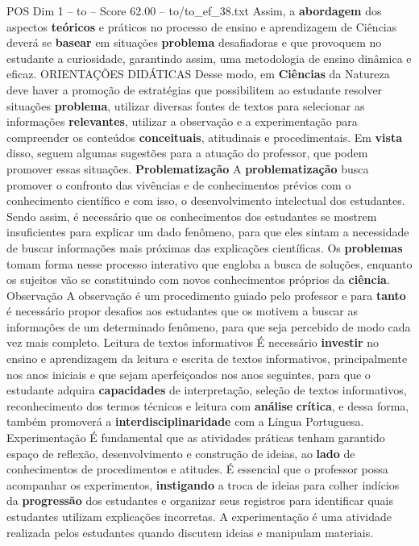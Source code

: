 \begin{textsample}{POS Dim 1 – to – Score 62.00 – to/to\_ef\_38.txt}
Assim, a \textbf{abordagem} dos aspectos \textbf{teóricos} e práticos no processo de ensino e aprendizagem de Ciências deverá se \textbf{basear} em situações \textbf{problema} desafiadoras e que provoquem no estudante a curiosidade, garantindo assim, uma metodologia de ensino dinâmica e eficaz.
ORIENTAÇÕES DIDÁTICAS Desse modo, em \textbf{Ciências} da Natureza deve haver a promoção de estratégias que possibilitem ao estudante resolver situações \textbf{problema}, utilizar diversas fontes de textos para selecionar as informações \textbf{relevantes}, utilizar a observação e a experimentação para compreender os conteúdos \textbf{conceituais}, atitudinais e procedimentais.
Em \textbf{vista} disso, seguem algumas sugestões para a atuação do professor, que podem promover essas situações. \textbf{Problematização} A \textbf{problematização} busca promover o confronto das vivências e de conhecimentos prévios com o conhecimento científico e com isso, o desenvolvimento intelectual dos estudantes.
Sendo assim, é necessário que os conhecimentos dos estudantes se mostrem insuficientes para explicar um dado fenômeno, para que eles sintam a necessidade de buscar informações mais próximas das explicações científicas.
Os \textbf{problemas} tomam forma nesse processo interativo que engloba a busca de soluções, enquanto os sujeitos vão se constituindo com novos conhecimentos próprios da \textbf{ciência}.
Observação A observação é um procedimento guiado pelo professor e para \textbf{tanto} é necessário propor desafios aos estudantes que os motivem a buscar as informações de um determinado fenômeno, para que seja percebido de modo cada vez mais completo.
Leitura de textos informativos É necessário \textbf{investir} no ensino e aprendizagem da leitura e escrita de textos informativos, principalmente nos anos iniciais e que sejam aperfeiçoados nos anos seguintes, para que o estudante adquira \textbf{capacidades} de interpretação, seleção de textos informativos, reconhecimento dos termos técnicos e leitura com \textbf{análise} \textbf{crítica}, e dessa forma, também promoverá a \textbf{interdisciplinaridade} com a Língua Portuguesa.
Experimentação É fundamental que as atividades práticas tenham garantido espaço de reflexão, desenvolvimento e construção de ideias, ao \textbf{lado} de conhecimentos de procedimentos e atitudes.
É essencial que o professor possa acompanhar os experimentos, \textbf{instigando} a troca de ideias para colher indícios da \textbf{progressão} dos estudantes e organizar seus registros para identificar quais estudantes utilizam explicações incorretas.
A experimentação é uma atividade realizada pelos estudantes quando discutem ideias e manipulam materiais.

\end{textsample}
